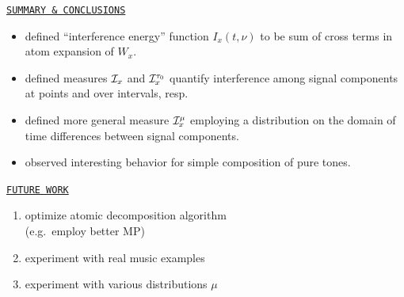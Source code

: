 \documentclass{slides}
\begin{document}
\begin{slide}%
\begin{center}{\tt \underline{SUMMARY \& CONCLUSIONS}}\end{center}
\begin{itemize}
\item defined ``interference energy'' function $I_x(t,\nu)$ to be sum of
cross terms in atom expansion of $W_x$.
\item defined measures $\mathcal{I}_x$ and $\mathcal{I}_x^{\tau_0}$ quantify interference among
signal components at points and over intervals, resp.
\item defined more general measure $\mathcal{I}_x^{\mu}$ employing a distribution
on the domain of time differences between signal components.  
\item observed interesting behavior for simple composition of pure tones.  
\end{itemize}
\end{slide}
\begin{slide}
\begin{center}{\tt \underline{FUTURE WORK}}\end{center}
\begin{enumerate}
\item optimize atomic decomposition algorithm \\(e.g.~employ better MP)
\item experiment with real music examples
\item experiment with various distributions $\mu$
\end{enumerate}
\end{slide}
\end{document}
